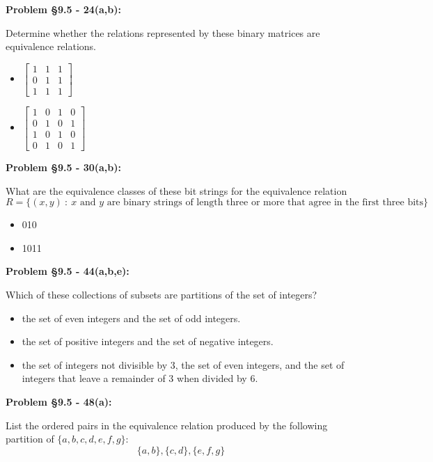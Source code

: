 \documentclass{article}
\newenvironment{problem}[1]
    {\begin{mdframed}[default]
    \textbf{Problem #1:}
    }
    {\end{mdframed}
    }
\begin{document}
\begin{problem}{\S 9.5 - 24(a,b)}
Determine whether the relations represented by these binary matrices are equivalence relations.
\begin{itemize}
    \item[(a)] $\begin{bmatrix} 1 & 1 & 1 \\ 0 & 1 & 1 \\ 1 & 1 & 1 \end{bmatrix}$
    \item[(b)] $\begin{bmatrix} 1 & 0 & 1 & 0 \\ 0 & 1 & 0 & 1 \\ 1 & 0 & 1 & 0 \\ 0 & 1 & 0 & 1 \end{bmatrix}$
\end{itemize}
\end{problem}


\begin{problem}{\S 9.5 - 30(a,b)}
What are the equivalence classes of these bit strings for the equivalence relation
\[ R = \{ (x,y)~:~ x \textrm{ and } y \textrm{ are binary strings of length three or more that agree in the first three bits}\} \]
\begin{itemize}
    \item[(a)] 010
    \item[(b)] 1011
\end{itemize}
\end{problem}


\begin{problem}{\S 9.5 - 44(a,b,e)}
Which of these collections of subsets are partitions of the set of integers?
\begin{itemize}
    \item[(a)] the set of even integers and the set of odd integers.
    \item[(b)] the set of positive integers and the set of negative integers.
    \item[(e)] the set of integers not divisible by 3, the set of even integers, and the set of integers that leave a remainder of 3 when divided by 6.
\end{itemize}
\end{problem}


\begin{problem}{\S 9.5 - 48(a)}
List the ordered pairs in the equivalence relation produced by the following partition of $\{ a, b, c, d, e, f, g \}$:
\[ \{ a, b \}, \{ c, d \}, \{ e, f, g \} \]
\end{problem}
\end{document}
